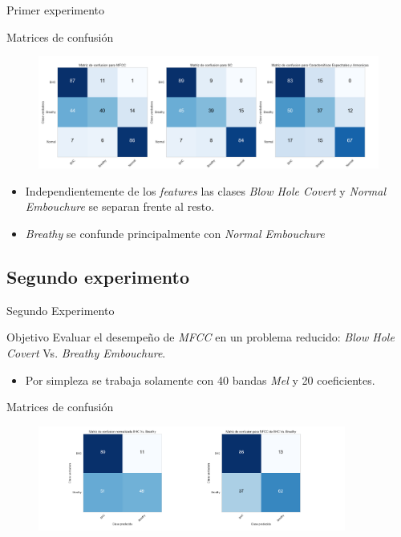 \documentclass[aspectratio=169]{beamer}
\begin{document}
\begin{frame}{Primer experimento}
\begin{block}{Matrices de confusión}
\begin{figure}[H]
\begin{center}
\includegraphics[width=1\textwidth]{exp1_confusion} 
\end{center}
\end{figure}
\begin{itemize}
\item Independientemente de los \textit{features} las clases \textit{Blow Hole Covert} y \textit{Normal Embouchure} se separan frente al resto.
\item \textit{Breathy} se confunde principalmente con \textit{Normal Embouchure}
\end{itemize}
\end{block}
\end{frame}


\subsection{Segundo experimento}

\begin{frame}{Segundo Experimento}
\begin{block}{Objetivo}
Evaluar el desempeño de \textit{MFCC} en un problema reducido: \textit{Blow Hole Covert} Vs. \textit{Breathy Embouchure}.
\begin{itemize}
\item Por simpleza se trabaja solamente con 40 bandas \textit{Mel} y 20 coeficientes.
\end{itemize}
\end{block}
\begin{block}{Matrices de confusión}
\begin{figure}[H]
\begin{center}
\includegraphics[width=0.9\textwidth]{exp2_confusion} 
\end{center}
\end{figure}
\end{block}
\end{frame}
\end{document}
